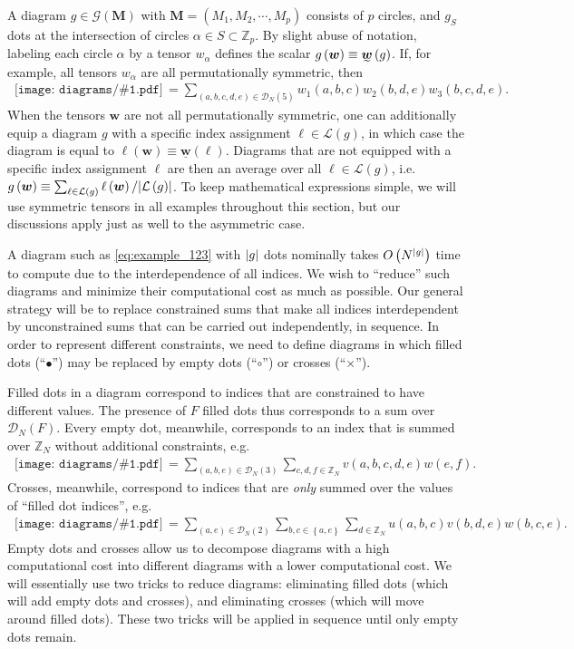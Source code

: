 \documentclass[nofootinbib,notitlepage,11pt]{revtex4-2}
\newcommand{\p}[1]{\left(#1\right)} %
\renewcommand{\set}[1]{\left\{#1\right\}} %
\newcommand{\m}{\bm} %
\newcommand{\1}{\mathds{1}}
\newcommand{\D}{\mathcal{D}}
\newcommand{\G}{\mathcal{G}}
\renewcommand{\L}{\mathcal{L}}
\newcommand{\ZZ}{\mathbb{Z}}
\newcommand{\ut}{\undertilde}
\newcommand{\col}{\underline}
\newcommand{\diagram}[1]
{\,\texttt{[image: diagrams/\#1.pdf]}\,}
\begin{document}
A diagram $g\in\G\p{\m M}$ with $\m M=\p{M_1,M_2,\cdots,M_p}$ consists of $p$ circles, and $g_S$ dots at the intersection of circles $\alpha\in S\subset\ZZ_p$.
By slight abuse of notation, labeling each circle $\alpha$ by a tensor $w_\alpha$ defines the scalar $g\p{\m w}\equiv\ut{\m w}\p{g}$.
If, for example, all tensors $w_\alpha$ are all permutationally symmetric, then
\begin{align}
  \diagram{example_w123}
  = \sum_{\p{a,b,c,d,e}\in\D_N\p{5}}
  w_1\p{a,b,c} w_2\p{b,d,e} w_3\p{b,c,d,e}.
  \label{eq:example_123}
\end{align}
When the tensors $\m w$ are not all permutationally symmetric, one can additionally equip a diagram $g$ with a specific index assignment $\ell\in\L\p{g}$, in which case the diagram is equal to $\ell\p{\m w}\equiv\col{\m w}\p{\ell}$.
Diagrams that are not equipped with a specific index assignment $\ell$ are then an average over all $\ell\in\L\p{g}$, i.e.~$g\p{\m w}\equiv\sum_{\ell\in\L\p{g}} \ell\p{\m w} / \abs{\L\p{g}}$.
To keep mathematical expressions simple, we will use symmetric tensors in all examples throughout this section, but our discussions apply just as well to the asymmetric case.

A diagram such as \eqref{eq:example_123} with $\abs{g}$ dots nominally takes $O\p{N^{\abs{g}}}$ time to compute due to the interdependence of all indices.
We wish to ``reduce'' such diagrams and minimize their computational cost as much as possible.
Our general strategy will be to replace constrained sums that make all indices interdependent by unconstrained sums that can be carried out independently, in sequence.
In order to represent different constraints, we need to define diagrams in which filled dots (``$\bullet$'') may be replaced by empty dots (``$\circ$'') or crosses (``$\bm\times$'').

Filled dots in a diagram correspond to indices that are constrained to have different values.
The presence of $F$ filled dots thus corresponds to a sum over $\D_N\p{F}$.
Every empty dot, meanwhile, corresponds to an index that is summed over $\ZZ_N$ without additional constraints, e.g.
\begin{align}
  \diagram{example_o}
  = \sum_{\p{a,b,e}\in\D_N\p{3}} \sum_{c,d,f\in\ZZ_N}
  v\p{a,b,c,d,e} w\p{e,f}.
\end{align}
Crosses, meanwhile, correspond to indices that are {\it only} summed over the values of ``filled dot indices'', e.g.
\begin{align}
  \diagram{example_x}
  = \sum_{\p{a,e}\in\D_N\p{2}} \sum_{b,c\in\set{a,e}} \sum_{d\in\ZZ_N}
  u\p{a,b,c} v\p{b,d,e} w\p{b,c,e}.
\end{align}
Empty dots and crosses allow us to decompose diagrams with a high computational cost into different diagrams with a lower computational cost.
We will essentially use two tricks to reduce diagrams: eliminating filled dots (which will add empty dots and crosses), and eliminating crosses (which will move around filled dots).
These two tricks will be applied in sequence until only empty dots remain.
\end{document}
